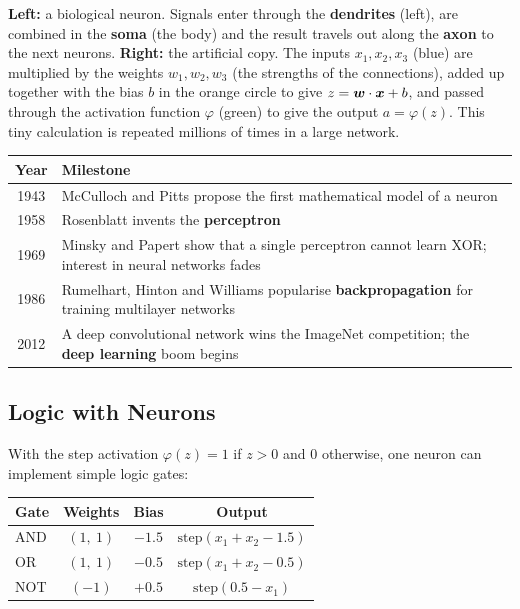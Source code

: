 \begin{explain}
\textbf{Left:} a biological neuron. Signals enter through the \textbf{dendrites} (left), are combined in the \textbf{soma} (the body) and the result travels out along the \textbf{axon} to the next neurons. \textbf{Right:} the artificial copy. The inputs $x_1,x_2,x_3$ (blue) are multiplied by the weights $w_1,w_2,w_3$ (the strengths of the connections), added up together with the bias $b$ in the orange circle to give $z=\boldsymbol{w}\cdot\boldsymbol{x}+b$, and passed through the activation function $\varphi$ (green) to give the output $a=\varphi(z)$. This tiny calculation is repeated millions of times in a large network.
\end{explain}

\begin{center}
\begin{tabular}{@{}cp{11cm}@{}}
\toprule
\textbf{Year} & \textbf{Milestone}\\
\midrule
1943 & McCulloch and Pitts propose the first mathematical model of a neuron\\
1958 & Rosenblatt invents the \textbf{perceptron}\\
1969 & Minsky and Papert show that a single perceptron cannot learn XOR; interest in neural networks fades\\
1986 & Rumelhart, Hinton and Williams popularise \textbf{backpropagation} for training multilayer networks\\
2012 & A deep convolutional network wins the ImageNet competition; the \textbf{deep learning} boom begins\\
\bottomrule
\end{tabular}
\end{center}

\subsection{Logic with Neurons}

With the step activation $\varphi(z)=1$ if $z>0$ and $0$ otherwise, one neuron can implement simple logic gates:

\begin{center}
\begin{tabular}{@{}lccc@{}}
\toprule
\textbf{Gate} & \textbf{Weights} & \textbf{Bias} & \textbf{Output}\\
\midrule
AND & $(1,\ 1)$ & $-1.5$ & $\text{step}(x_1+x_2-1.5)$\\
OR & $(1,\ 1)$ & $-0.5$ & $\text{step}(x_1+x_2-0.5)$\\
NOT & $(-1)$ & $+0.5$ & $\text{step}(0.5-x_1)$\\
\bottomrule
\end{tabular}
\end{center}

